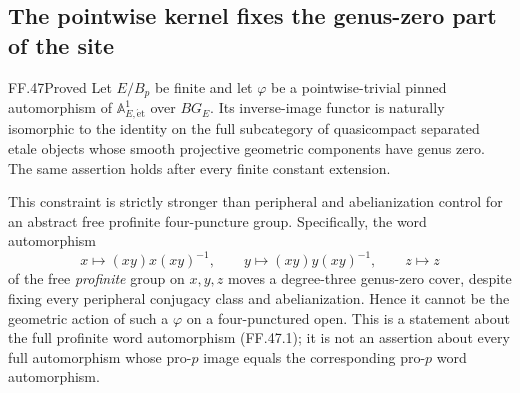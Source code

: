\subsection{The pointwise kernel fixes the genus-zero part of the site}

\begin{claim}{FF.47}{Proved}\label{clm:FFgenuszerokernel}
Let \(E/B_p\) be finite and let \(\varphi\) be a
pointwise-trivial pinned automorphism of
\(\mathbb A^1_{E,\mathrm{\acute et}}\) over \(BG_E\).
Its inverse-image functor is naturally isomorphic to the
identity on the full subcategory of quasicompact separated
etale objects whose smooth projective geometric components
have genus zero. The same assertion holds after every
finite constant extension.

This constraint is strictly stronger than peripheral and
abelianization control for an abstract free profinite
four-puncture group. Specifically, the word automorphism
\[
 x\longmapsto(xy)x(xy)^{-1},\qquad
 y\longmapsto(xy)y(xy)^{-1},\qquad z\longmapsto z
                                                        \tag{FF.47.1}
\]
of the free \emph{profinite} group on \(x,y,z\) moves
a degree-three genus-zero cover, despite fixing every
peripheral conjugacy class and abelianization. Hence it
cannot be the geometric action of such a \(\varphi\)
on a four-punctured open. This is a statement about the
full profinite word automorphism (FF.47.1); it is not an
assertion about every full automorphism whose pro-\(p\)
image equals the corresponding pro-\(p\) word automorphism.
\end{claim}

